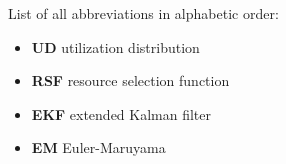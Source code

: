 
List of all abbreviations in alphabetic order:

\begin{itemize}
    \item \textbf{UD} utilization distribution
    \item \textbf{RSF} resource selection function
    \item \textbf{EKF} extended Kalman filter
    \item \textbf{EM} Euler-Maruyama
    
\end{itemize}